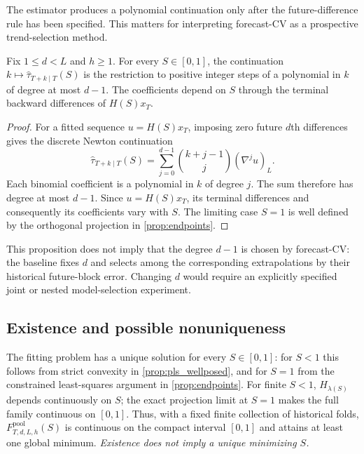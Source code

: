 The estimator produces a polynomial continuation only after the
future-difference rule has been specified. This matters for
interpreting forecast-CV as a prospective trend-selection method.

\begin{proposition}
\label{prop:continuation_polynomial}
Fix $1\le d<L$ and $h\ge1$. For every $S\in[0,1]$, the
continuation $k\mapsto\widehat\tau_{T+k\mid T}(S)$ is the
restriction to positive integer steps of a polynomial in
$k$ of degree at most $d-1$. The coefficients depend on
$S$ through the terminal backward differences of $H(S)x_T$.
\end{proposition}

\begin{proof}
For a fitted sequence $u=H(S)x_T$, imposing zero future
$d$th differences gives the discrete Newton continuation
\begin{equation}
\label{eq:newton_forecast_polynomial}
\widehat\tau_{T+k\mid T}(S)
=\sum_{j=0}^{d-1}\binom{k+j-1}{j}
(\nabla^j u)_L.
\end{equation}
Each binomial coefficient is a polynomial in $k$ of
degree $j$. The sum therefore has degree at most
$d-1$. Since $u=H(S)x_T$, its terminal differences
and consequently its coefficients vary with $S$.
The limiting case $S=1$ is well defined by the
orthogonal projection in \cref{prop:endpoints}.
\end{proof}

This proposition does not imply that the degree $d-1$
is chosen by forecast-CV: the baseline fixes $d$ and
selects among the corresponding extrapolations by
their historical future-block error. Changing $d$
would require an explicitly specified joint or
nested model-selection experiment.

\subsection{Existence and possible nonuniqueness}

The fitting problem has a unique solution for every $S\in[0,1]$: for $S<1$ this follows from strict convexity in \cref{prop:pls_wellposed}, and for $S=1$ from the constrained least-squares argument in \cref{prop:endpoints}. For finite $S<1$, $H_{\lambda(S)}$ depends continuously on $S$; the exact projection limit at $S=1$ makes the full family continuous on $[0,1]$. Thus, with a fixed finite collection of historical folds, $F^{\mathrm{pool}}_{T,d,L,h}(S)$ is continuous on the compact interval $[0,1]$ and attains at least one global minimum. \emph{Existence does not imply a unique minimizing $S$.}

